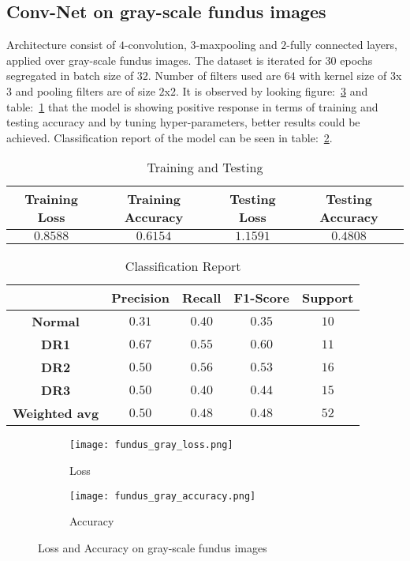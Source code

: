 \documentclass[12pt,a4paper,titlepage]{report}
\begin{document}
\subsection{Conv-Net on gray-scale fundus images}
Architecture consist of $4$-convolution, $3$-maxpooling and $2$-fully connected layers, applied over gray-scale fundus images. The dataset is iterated for $30$ epochs segregated in batch size of $32$. Number of filters used are $64$ with kernel size of $3$x$3$ and pooling filters are of size $2$x$2$. It is observed by looking figure:~\ref{fig: Image1} and table:~\ref{tab: Table-2} that the model is showing positive response in terms of training and testing accuracy and by tuning hyper-parameters, better results could be achieved. Classification report of the model can be seen in table:~\ref{tab: Table-3}. \vspace{10pt}
\vspace{10pt}
\begin{table}[H]
\centering
\caption{Training and Testing}
\label{tab: Table-2}
\begin{tabular}{c c c c}
\hline
\textbf{Training Loss} & \textbf{Training Accuracy} & \textbf{Testing Loss} & \textbf{Testing Accuracy}\\
\hline
$0.8588$ & $0.6154$ & $1.1591$ & $0.4808$\\
\hline
\end{tabular}
\end{table}
\vspace{20pt}
\begin{table}[H]
\centering
\caption{Classification Report}
\label{tab: Table-3}
\begin{tabular}{c c c c c}
\hline
\textbf{} & \textbf{Precision} & \textbf{Recall} & \textbf{F1-Score} & \textbf{Support} \\
\hline
\textbf{Normal} & $0.31$ & $0.40$ & $0.35$ & $10$\\
\textbf{DR1} & $0.67$ & $0.55$ & $0.60$ & $11$\\
\textbf{DR2} & $0.50$ & $0.56$ & $0.53$ & $16$\\
\textbf{DR3} & $0.50$ & $0.40$ & $0.44$ & $15$\\
\textbf{Weighted avg} & $0.50$ & $0.48$ & $0.48$ & $52$\\
\hline
\end{tabular}
\end{table}

\begin{figure}[H]
\centering
\begin{subfigure}[h]{0.45\linewidth}
\texttt{[image: fundus\_gray\_loss.png]}
\caption{Loss}
\label{fig:a}
\end{subfigure}
\quad
\begin{subfigure}[h]{0.45\linewidth}
\texttt{[image: fundus\_gray\_accuracy.png]}
\caption{Accuracy}
\label{fig:b}
\end{subfigure}
\caption{Loss and Accuracy on gray-scale fundus images}
\label{fig: Image1}
\end{figure}    
\end{document}
